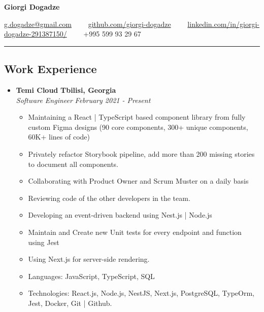 \documentclass[10pt,letterpaper]{article}
\begin{document}
 
\begin{center}
{\huge \textbf{Giorgi Dogadze}}


\vspace{1em}

\href{mailto:g.dogadze@gmail.com}{g.dogadze@gmail.com} 
\ \ \textbullet \ \ 
\href{https://github.com/giorgi-dogadze}{github.com/giorgi-dogadze} 
\ \ \textbullet \ \ 
\href{https://www.linkedin.com/in/giorgi-dogadze-291387150/}{linkedin.com/in/giorgi-dogadze-291387150/}
\newline
\ \ \textbullet \ \ 
+995 599 93 29 67\end{center}


\hrule
\vspace{-1.0em}
\subsection*{Work Experience}
  \begin{itemize}
    \item[]
    {\textbf{Temi Cloud} \hfill
      \textbf{Tbilisi, Georgia}}
    \\
    {\emph{Software Engineer} \hfill \emph{February 2021 - Present}}

    \begin{itemize}[label=\textbullet]
    \itemsep0.5em
    \item Maintaining a React | TypeScript based component library from fully custom Figma designs (90 core components, 300+ unique components, 60K+ lines of code)
    \item Privately refactor Storybook pipeline, add more than 200 missing stories to document all components.
    \item Collaborating with Product Owner and Scrum Muster on a daily basis
    \item Reviewing code of the other developers in the team.
    \item Developing an event-driven backend using Nest.js | Node.js
    \item Maintain and Create new Unit tests for every endpoint and function using Jest
    \item Using Next.js for server-side rendering.
    \item Languages: JavaScript, TypeScript, SQL
    \item Technologies: React.js, Node.js, NestJS, Next.js, PostgreSQL, TypeOrm, Jest, Docker, Git | Github.
    \end{itemize}
  
\end{itemize}
\end{document}
